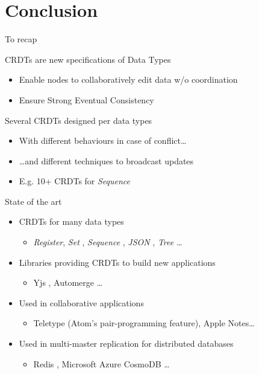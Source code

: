 \section{Conclusion}

\begin{frame}{To recap}
    \begin{block}{CRDTs are new specifications of Data Types}
        \begin{itemize}
            \item Enable nodes to collaboratively edit data w/o coordination
            \item Ensure Strong Eventual Consistency
        \end{itemize}
    \end{block}
    \pause
    \begin{block}{Several CRDTs designed per data types}
        \begin{itemize}
            \item With different behaviours in case of conflict\dots
            \item \dots and different techniques to broadcast updates
            \item E.g. 10+ CRDTs for \emph{Sequence}
        \end{itemize}
    \end{block}
\end{frame}

\begin{frame}{State of the art}
    \begin{itemize}
        \item CRDTs for many data types
        \begin{itemize}
            \item \emph{Register}, \emph{Set} \cite{2018-crdts-overview-preguica}, \emph{Sequence} \cite{ROH2011354,2009-logoot-weiss}, \emph{JSON} \cite{jsoncrdt2017}, \emph{Tree} \cite{2022-tree-crdt-kleppmann} \dots
        \end{itemize}
        \item Libraries providing CRDTs to build new applications
        \begin{itemize}
            \item Yjs \cite{yjsimplem}, Automerge \cite{automerge}\dots
        \end{itemize}
        \pause
        \item Used in collaborative applications
        \begin{itemize}
            \item Teletype (Atom's pair-programming feature), Apple Notes\dots
        \end{itemize}
        \item Used in multi-master replication for distributed databases
        \begin{itemize}
            \item Redis \cite{RedisEnterpriseActiveActiveGeoDistribution}, Microsoft Azure CosmoDB \cite{AzureCosmosDB}\dots
        \end{itemize}
    \end{itemize}
\end{frame}

